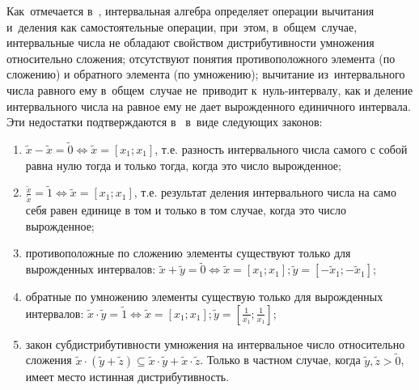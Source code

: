 Как~отмечается в~\cite{Pospelov, Sokolov}, интервальная алгебра определяет операции вычитания и~деления как самостоятельные операции, при~этом, в~общем~случае, интервальные числа не обладают свойством дистрибутивности умножения относительно сложения; отсутствуют понятия противоположного элемента (по сложению) и обратного элемента (по умножению); вычитание из~интервального числа равного ему в~общем~случае не~приводит к~нуль-интервалу, как и деление интервального числа на равное ему не дает вырожденного единичного интервала. Эти недостатки подтверждаются в~\cite{Levin} в~виде следующих законов:
\begin{enumerate}
	\item $\tilde{x}-\tilde{x}=\tilde{0}\Leftrightarrow \tilde{x}=\left[ {{x}_{1}};{{x}_{1}} \right]$, т.е. разность интервального числа самого с собой равна нулю тогда и только тогда, когда это число вырожденное;
	\item $\displaystyle \frac{{\tilde{x}}}{{\tilde{x}}}=\tilde{1}\Leftrightarrow \tilde{x}=\left[ {{x}_{1}};{{x}_{1}} \right]$, т.е. результат деления интервального числа на само себя равен единице в том и только в том случае, когда это число вырожденное;
	\item противоположные по сложению элементы существуют только для вырожденных интервалов: $\tilde{x}+\tilde{y}=\tilde{0}\Leftrightarrow \tilde{x}=\left[ {{x}_{1}};{{x}_{1}} \right];\tilde{y}=\left[ -{{{\tilde{x}}}_{1}};-{{{\tilde{x}}}_{1}} \right]$;
	\item обратные по умножению элементы существую только для вырожденных интервалов: $\displaystyle \tilde{x}\cdot \tilde{y}=\tilde{1}\Leftrightarrow \tilde{x}=\left[ {{x}_{1}};{{x}_{1}} \right];\tilde{y}=\left[ \frac{1}{{{x}_{1}}};\frac{1}{x_1} \right]$;
	\item закон субдистрибутивности умножения на интервальное число относительно сложения $\tilde{x}\cdot \left( \tilde{y}+\tilde{z} \right)\subseteq \tilde{x}\cdot \tilde{y}+\tilde{x}\cdot \tilde{z}$. Только в частном случае, когда $\tilde y,\tilde z>\tilde 0$, имеет место истинная дистрибутивность.
\end{enumerate}

